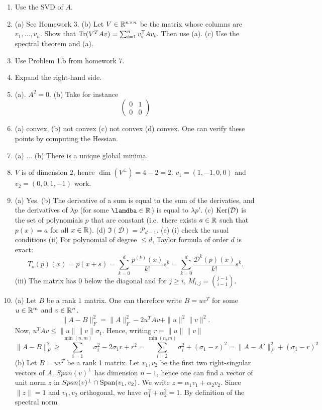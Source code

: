 \documentclass[11pt,nocut]{article}
\begin{document}
\begin{enumerate}
	\item Use the SVD of $A$.
	\item (a) See Homework 3. (b) Let $V \in \mathbb{R}^{n \times n}$ be the matrix whose columns are $v_1, \dots, v_n$. Show that ${{\rm Tr}}(V^T A v) = \sum_{i=1}^n v_i^{{\sf T}} A v_i$. Then use (a). (c) Use the spectral theorem and (a).
	\item Use Problem 1.b from homework 7.
	\item Expand the right-hand side.
	\item (a). $A^2 = 0$. (b) Take for instance
		$$
		\begin{pmatrix}
			0 & 1 \\
			0 & 0
		\end{pmatrix}
		$$
	\item (a) convex, (b) not convex (c) not convex (d) convex. One can verify these points by computing the Hessian.
	\item (a) ... (b) There is a unique global minima.
	\item $V$ is of dimension $2$, hence $\dim(V^{\perp}) = 4-2 = 2$. $v_1 = (1,-1,0,0)$ and $v_2 = (0, 0, 1,-1)$ work.
	\item (a) Yes. (b) The derivative of a sum is equal to the sum of the derivaties, and the derivatives of $\lambda p$ (for some $\lamdba \in \R$) is equal to $\lambda p'$.
		(c) ${{\rm Ker}}(\mathcal{D})$ is the set of polynomials $p$ that are constant (i.e.\ there exists $a\in\mathbb{R}$ such that $p(x) =a$ for all $x \in \mathbb{R}$).
		(d) $\Im(\mathcal{D}) = \mathcal{P}_{d-1}$.
		(e) (i) check the usual conditions (ii) For polynomial of degree $\leq d$, Taylor formula of order $d$ is exact:
		$$
		T_s(p)(x) = p(x+s) = \sum_{k=0}^d \frac{p^{(k)}(x)}{k!}s^k = \sum_{k=0}^d \frac{\mathcal{D}^k(p)(x)}{k!}s^k.
		$$
		(iii) The matrix has $0$ below the diagonal and for $j \geq i$, $M_{i,j} = \binom{j-1}{i-1}$.
	\item (a) Let $B$ be a rank $1$ matrix. One can therefore write $B = u v^T$ for some $u \in \mathbb{R}^m$ and $v \in \mathbb{R}^n$.
		$$
		\|A-B\|_F^2 = \|A\|^2_F - 2 u^T A v + \|u\|^2 \|v\|^2.
		$$
		Now, $u^T Av \leq \|u\| \|v\| \sigma_1$. Hence, writing $r=\|u\|\|v\|$
		$$
		\|A-B\|_F^2 \geq \sum_{i=1}^{\min(n,m)} \sigma_i^2 - 2 \sigma_1 r + r^2
		= \sum_{i=2}^{\min(n,m)} \sigma_i^2 + (\sigma_1 -r)^2
		= \|A-A'\|_{F}^2 + (\sigma_1 - r)^2
		$$
		(b) Let $B = u v^T$ be a rank 1 matrix. Let $v_1, v_2$ be the first two right-singular vectors of $A$. $Span(v)^{\perp}$ has dimension $n-1$, hence one can find a vector of unit norm $z$ in $Span(v)^{\perp} \cap {{\rm Span}}(v_1,v_2)$. We write $z = \alpha_1 v_1 + \alpha_2 v_2$. Since $\|z\|=1$ and $v_1, v_2$ orthogonal, we have $\alpha_1^2 + \alpha_2^2 = 1$. By definition of the spectral norm

\end{enumerate}
\end{document}
